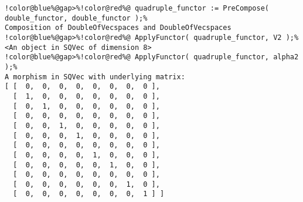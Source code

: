 \begin{Verbatim}[commandchars=!@\%,frame=single]
!color@blue%@gap>%!color@red%@ quadruple_functor := PreCompose( double_functor, double_functor );%
Composition of DoubleOfVecspaces and DoubleOfVecspaces
!color@blue%@gap>%!color@red%@ ApplyFunctor( quadruple_functor, V2 );%
<An object in SQVec of dimension 8>
!color@blue%@gap>%!color@red%@ ApplyFunctor( quadruple_functor, alpha2 );%
A morphism in SQVec with underlying matrix:
[ [  0,  0,  0,  0,  0,  0,  0,  0 ],
  [  1,  0,  0,  0,  0,  0,  0,  0 ],
  [  0,  1,  0,  0,  0,  0,  0,  0 ],
  [  0,  0,  0,  0,  0,  0,  0,  0 ],
  [  0,  0,  1,  0,  0,  0,  0,  0 ],
  [  0,  0,  0,  1,  0,  0,  0,  0 ],
  [  0,  0,  0,  0,  0,  0,  0,  0 ],
  [  0,  0,  0,  0,  1,  0,  0,  0 ],
  [  0,  0,  0,  0,  0,  1,  0,  0 ],
  [  0,  0,  0,  0,  0,  0,  0,  0 ],
  [  0,  0,  0,  0,  0,  0,  1,  0 ],
  [  0,  0,  0,  0,  0,  0,  0,  1 ] ]

\end{Verbatim}
